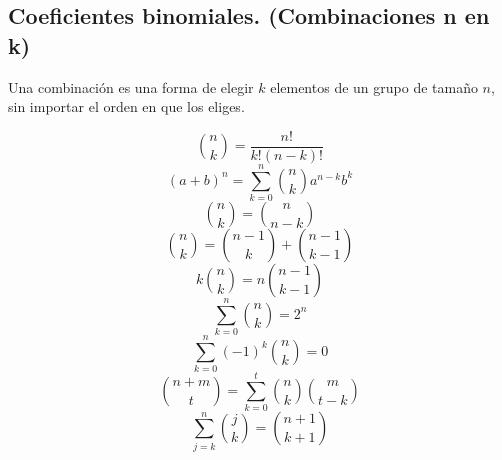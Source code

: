 \subsection{Coeficientes binomiales. (Combinaciones n en k)}
\begin{justify}
Una combinación es una forma de elegir $k$ elementos de un grupo de tamaño $n$, sin importar el orden en que los eliges.
\end{justify}
\begin{equation*}
    \binom{n}{k} = \frac{n!}{k!(n-k)!}
\end{equation*}
\begin{equation*}
    (a+b)^{n} = \sum_{k = 0}^{n} \binom{n}{k}a^{n-k}b^{k}
\end{equation*}
\begin{equation*}
    \binom{n}{k} = \binom{n}{n-k}
\end{equation*}
\begin{equation*}
    \binom{n}{k} = \binom{n-1}{k} + \binom{n-1}{k-1}
\end{equation*}
\begin{equation*}
    k\binom{n}{k} = n\binom{n-1}{k-1}
\end{equation*}
\begin{equation*}
    \sum_{k = 0}^{n}\binom{n}{k} = 2^{n}
\end{equation*}
\begin{equation*}
    \sum_{k = 0}^{n} (-1)^{k}\binom{n}{k} = 0
\end{equation*}
\begin{equation*}
    \binom{n+m}{t} = \sum_{k = 0}^{t}\binom{n}{k}\binom{m}{t-k}
\end{equation*}
\begin{equation*}
    \sum_{j = k}^{n} \binom{j}{k} = \binom{n+1}{k+1}
\end{equation*}

